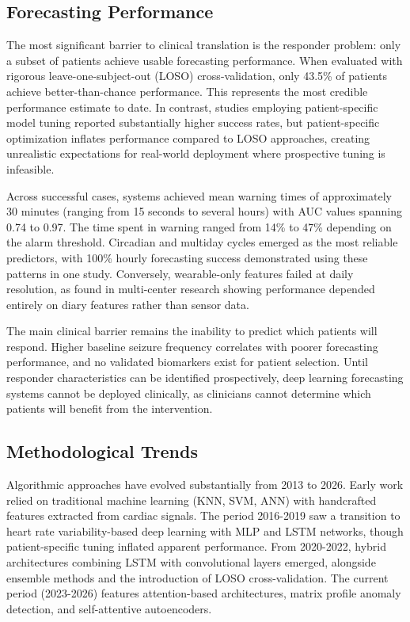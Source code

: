 \subsection{Forecasting Performance}

The most significant barrier to clinical translation is the responder problem: only a subset of patients achieve usable forecasting performance. When evaluated with rigorous leave-one-subject-out (LOSO) cross-validation, only 43.5\% of patients achieve better-than-chance performance. This represents the most credible performance estimate to date. In contrast, studies employing patient-specific model tuning reported substantially higher success rates, but patient-specific optimization inflates performance compared to LOSO approaches, creating unrealistic expectations for real-world deployment where prospective tuning is infeasible.

Across successful cases, systems achieved mean warning times of approximately 30 minutes (ranging from 15 seconds to several hours) with AUC values spanning 0.74 to 0.97. The time spent in warning ranged from 14\% to 47\% depending on the alarm threshold. Circadian and multiday cycles emerged as the most reliable predictors, with 100\% hourly forecasting success demonstrated using these patterns in one study. Conversely, wearable-only features failed at daily resolution, as found in multi-center research showing performance depended entirely on diary features rather than sensor data.

The main clinical barrier remains the inability to predict which patients will respond. Higher baseline seizure frequency correlates with poorer forecasting performance, and no validated biomarkers exist for patient selection. Until responder characteristics can be identified prospectively, deep learning forecasting systems cannot be deployed clinically, as clinicians cannot determine which patients will benefit from the intervention.

\subsection{Methodological Trends}

Algorithmic approaches have evolved substantially from 2013 to 2026. Early work relied on traditional machine learning (KNN, SVM, ANN) with handcrafted features extracted from cardiac signals. The period 2016-2019 saw a transition to heart rate variability-based deep learning with MLP and LSTM networks, though patient-specific tuning inflated apparent performance. From 2020-2022, hybrid architectures combining LSTM with convolutional layers emerged, alongside ensemble methods and the introduction of LOSO cross-validation. The current period (2023-2026) features attention-based architectures, matrix profile anomaly detection, and self-attentive autoencoders.

